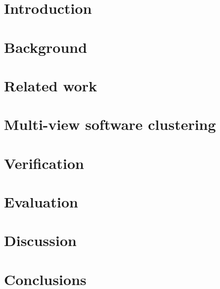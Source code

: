 \documentclass[12pt]{report}
\begin{document}
\listoffigures
{}
\clearpage

\listoftables
{}
\clearpage


\chapter{Introduction}\label{c:introduction}




\chapter{Background}\label{c:background}


\chapter{Related work}\label{c:related_work}


\chapter{Multi-view software clustering}\label{c:multi-view_clustering}


\chapter{Verification}\label{c:verification}


\chapter{Evaluation}\label{c:results}\label{c:results}


\chapter{Discussion}\label{c:discussion}


\chapter{Conclusions}\label{c:conclusions}


\appendix
%

\newpage
\printbibliography
\end{document}
